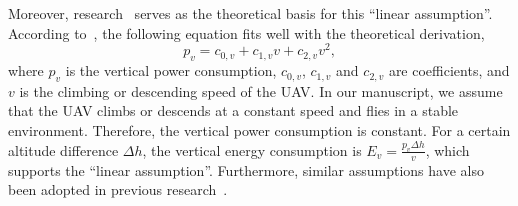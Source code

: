 \begin{revresponse}
	Moreover, research~\cite{vertical-assumption,mgh} serves as the theoretical basis for this ``linear assumption''.
	According to~\cite{vertical-assumption}, the following equation fits well with the theoretical derivation,
	\begin{equation}
		p_v = c_{0,v} + c_{1,v}v + c_{2,v}v^2,
	\end{equation}
	where $p_v$ is the vertical power consumption, $c_{0,v}$, $c_{1,v}$ and $c_{2,v}$ are coefficients, and $v$ is the climbing or descending speed of the UAV.
	In our manuscript, we assume that the UAV climbs or descends at a constant speed and flies in a stable environment.
	Therefore, the vertical power consumption is constant.
	For a certain altitude difference $\Delta h$, the vertical energy consumption is $E_v=\frac{p_v\Delta h}{v}$, which supports the ``linear assumption''.
	Furthermore, similar assumptions have also been adopted in previous research~\cite{mgh}.
\end{revresponse}

